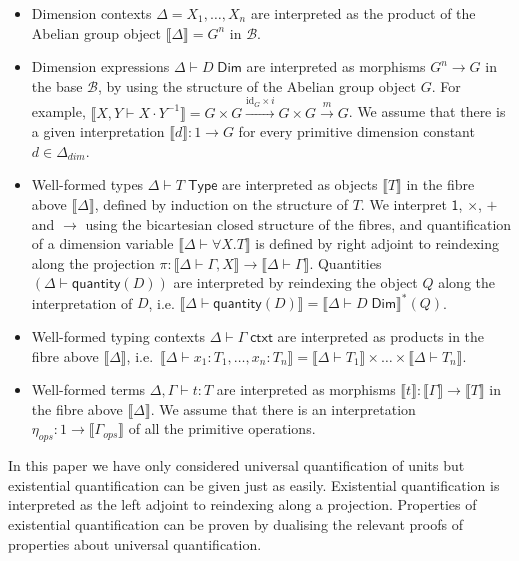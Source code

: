 \documentclass[a4paper,UKenglish]{lipics}
\theoremstyle{plain}
\newcommand{\ra}{\rightarrow}
\newcommand{\msf}[1]{\mathsf{#1}} %
\newcommand{\B}{\mathcal{B}}
\newcommand{\sem}[1]{\ensuremath{\llbracket #1 \rrbracket}}
\newcommand{\unitTy}{\msf{1}}
\newcommand{\qnt}{\msf{quantity}}
\newcommand{\Deltadim}{\ensuremath{\Delta_{dim}}}
\newcommand{\Gammaops}{\ensuremath{\Gamma_{ops}}}
\newcommand{\etaops}{\ensuremath{\eta_{ops}}}
\newcommand{\Dj}[2]{#1 \vdash #2 \; \msf{ Dim}}
\newcommand{\id}{\mathrm{id}}
\begin{document}
\begin{itemize}
\item Dimension contexts $\Delta = X_1, \ldots, X_n$ are interpreted as the product of the Abelian group object $\sem{\Delta} = G^n$ in $\B$.
\item Dimension expressions $\Dj \Delta D$ are interpreted as morphisms $G^n \ra G$ in the base $\B$, by using the structure of the Abelian group object $G$. For example, $\sem{X, Y \vdash X \cdot Y^{-1}} = G\times G\xrightarrow{\id_G\times i}G\times G\xrightarrow m G$. We assume that there is a given interpretation $\sem d : 1 \to G$ for every primitive dimension constant $d \in \Deltadim$.

\item Well-formed types $\Delta \vdash T \; \msf{ Type}$ are interpreted as objects $\sem{T}$ in the fibre above $\sem{\Delta}$,  defined by induction on the structure of $T$. We interpret $\unitTy$, $\times$, $+$ and $\rightarrow$ using the bicartesian closed structure of the fibres, and quantification of a dimension variable $\sem{\Delta \vdash \forall X. T}$ is defined by right adjoint to reindexing along the projection $\pi: \sem{\Delta \vdash \Gamma, X} \rightarrow \sem{\Delta \vdash \Gamma}$. Quantities $(\Delta \vdash \qnt(D))$ are interpreted by reindexing the object $Q$ along the interpretation of $D$, i.e. $\sem{\Delta \vdash \qnt(D)} = {\sem{\Dj \Delta D}}^* (Q)$.

\item Well-formed typing contexts $\Delta \vdash \Gamma \; \msf{ ctxt}$ are interpreted as products in the fibre above $\sem{\Delta}$, i.e.\ $\sem{\Delta \vdash x_1 : T_1 ,\ldots, x_n:T_n} = \sem{\Delta \vdash T_1} \times \ldots \times \sem{\Delta \vdash T_n}$.

\item Well-formed terms $\Delta, \Gamma \vdash t : T$ are interpreted as morphisms $\sem{t} : \sem{\Gamma} \ra \sem{T}$ in the fibre above $\sem{\Delta}$. We assume that there is an interpretation $\etaops : 1 \to \sem{\Gammaops}$ of all the primitive operations.
\end{itemize}

In this paper we have only considered universal quantification of units but existential quantification can be given just as easily. Existential quantification is interpreted as the left adjoint to reindexing along a projection. Properties of  existential quantification can be proven by dualising the relevant proofs of properties about universal quantification.
\end{document}
